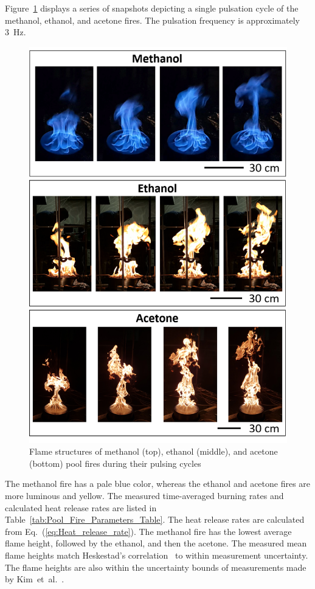 \documentclass[12pt]{article}
\begin{document}
Figure~\ref{fig:Flame_Structure} displays a series of snapshots depicting a single pulsation cycle of the methanol, ethanol, and acetone fires. The pulsation frequency is approximately 3~Hz.
\begin{figure}[p]
	\centering
\includegraphics[width=5.0in,keepaspectratio]{Flame_Structure.png}
	\caption[Pool Fire Structures]{Flame structures of methanol (top), ethanol (middle), and acetone (bottom) pool fires during their pulsing cycles}
	\label{fig:Flame_Structure}
\end{figure}
The methanol fire has a pale blue color, whereas the ethanol and acetone fires are more luminous and yellow. The measured time-averaged burning rates and calculated heat release rates are listed in Table~\ref{tab:Pool_Fire_Parameters_Table}. The heat release rates are calculated from Eq.~(\ref{eq:Heat_release_rate}). The methanol fire has the lowest average flame height, followed by the ethanol, and then the acetone. The measured mean flame heights match Heskestad’s correlation~\cite{Heskestad1983} to within measurement uncertainty. The flame heights are also within the uncertainty bounds of measurements made by Kim~et~al.~\cite{Kim2019}.
\end{document}
